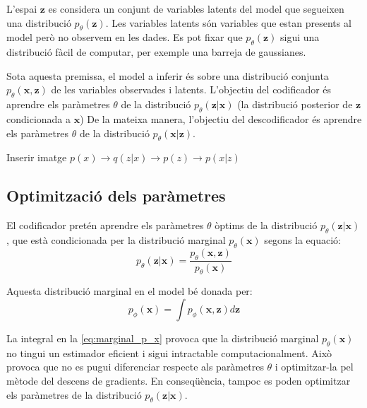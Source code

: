 \documentclass[CAT,BIB]{TFUOC}%
\newcommand{\todo}[1]{
            \begin{tcolorbox}[title=ToDo!, colback=red!5!white, colframe=red!50!black, coltext=red!50!black]
            #1
            \end{tcolorbox}}
\begin{document}
        L'espai $\mathbf{z}$ es considera un conjunt de variables latents del model
        que segueixen una distribució $p_\theta(\mathbf{z})$.
        Les variables latents són variables que estan presents al model però no observem en les dades.
        Es pot fixar que $p_\theta(\mathbf{z})$ sigui una distribució fàcil de computar,
        per exemple una barreja de gaussianes.

        Sota aquesta premissa,
        el model a inferir és sobre una distribució conjunta $p_\theta(\mathbf{x,z})$
        de les variables observades i latents.
        L'objectiu del codificador és aprendre els paràmetres $\theta$
        de la distribució $p_\theta(\mathbf{z|x})$
        (la distribució posterior de $\mathbf{z}$ condicionada a $\mathbf{x}$)
        De la mateixa manera,
        l'objectiu del descodificador és aprendre els paràmetres $\theta$
        de la distribució $p_\theta(\mathbf{x|z})$.

\todo{Inserir imatge $p(x) \rightarrow q(z|x) \rightarrow p(z) \rightarrow p(x|z)$}

        \subsection{Optimització dels paràmetres}
        \label{s:vae_optimitzacio}

            El codificador pretén aprendre els paràmetres $\theta$ òptims
            de la distribució $p_\theta(\mathbf{z|x})$,
            que està condicionada per la distribució marginal $p_\theta(\mathbf{x})$
            segons la equació:
            \begin{equation}
            \label{eq:cond_p_z_on_x}
                p_\theta(\mathbf{z|x}) =
                \frac {p_\theta(\mathbf{x,z})}
                      {p_\theta(\mathbf{x})}
            \end{equation}

            Aquesta distribució marginal en el model bé donada per:
            \begin{equation}
            \label{eq:marginal_p_x}
                p_\phi(\mathbf{x}) = \int p_\phi(\mathbf{x, z}) d\mathbf{z}
            \end{equation}

            La integral en la \cref{eq:marginal_p_x} provoca que
            la distribució marginal $p_\theta(\mathbf{x})$ no tingui un estimador eficient
            i sigui intractable computacionalment.
            Això provoca que no es pugui diferenciar respecte als paràmetres $\theta$
            i optimitzar-la pel mètode del descens de gradients.
            En conseqüència,
            tampoc es poden optimitzar els paràmetres de la distribució $p_\theta(\mathbf{z|x})$.
\end{document}
